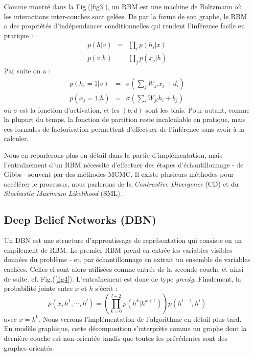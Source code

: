 \documentclass[10pt,a4paper]{article}
\begin{document}
Comme montré dans la Fig.(\ref{fig3}), un RBM est une machine de Boltzmann où les interactions inter-couches sont gelées. De par la forme de son graphe, le RBM a des propriétés d'indépendances conditionnelles qui rendent l'inférence facile en pratique : 
\begin{equation}
\begin{array}{rll}
p(h|v) & = & \displaystyle \prod_{i} p(h_i|x) \\
p(v|h) & = & \displaystyle \prod_{j} p(x_j|h)
\end{array}
\end{equation}
Par suite on a : 
\begin{equation}
\begin{array}{rll}
p(h_i = 1 |v ) & = & \displaystyle \sigma\left(\sum_j W_{ji}x_j + d_i\right) \\
p(x_j = 1 |h ) & = & \displaystyle \sigma\left(\sum_i W_{ji}h_i + b_j\right)
\end{array}
\end{equation}
où $\sigma$ est la fonction d'activation, et les $(b,d)$ sont les biais. Pour autant, comme la plupart du temps, la fonction de partition reste incalculable en pratique, mais ces formules de factorisation permettent d'effectuer de l'inférence sans avoir à la calculer.

Nous en reparlerons plus en détail dans la partie d'implémentation, mais l'entraînement d'un RBM nécessite d'effectuer des étapes d'échantillonnage - de Gibbs - souvent par des méthodes MCMC. Il existe plusieurs méthodes pour accélérer le processus, nous parlerons de la \emph{Contrastive Divergence} (CD) et du \emph{Stochastic Maximum Likelihood} (SML).



\subsection{Deep Belief Networks (DBN)}

Un DBN est une structure d'apprentissage de représentation qui consiste en un empilement de RBM. Le premier RBM prend en entrée les variables visibles - données du problème - et, par échantillonnage en extrait un ensemble de variables cachées. Celles-ci sont alors utilisées comme entrée de la seconde couche et ainsi de suite, cf. Fig.(\ref{fig4}). L'entraînement est donc de type \emph{greedy}. Finalement, la probabilité jointe entre $x$ et $h$ s'écrit :
\begin{equation}
p(x, h^1, \cdots, h^l) = \left( \prod_{k=0}^{l-2} p(h^k |h^{k+1}) \right) p(h^{l-1}, h^l)
\end{equation}
avec $x=h^0$. Nous verrons l'implémentation de l'algorithme en détail plus tard. En modèle graphique, cette décomposition s'interprète comme un graphe dont la dernière couche est non-orientée tandis que toutes les précédentes sont des graphes orientés.
\end{document}
